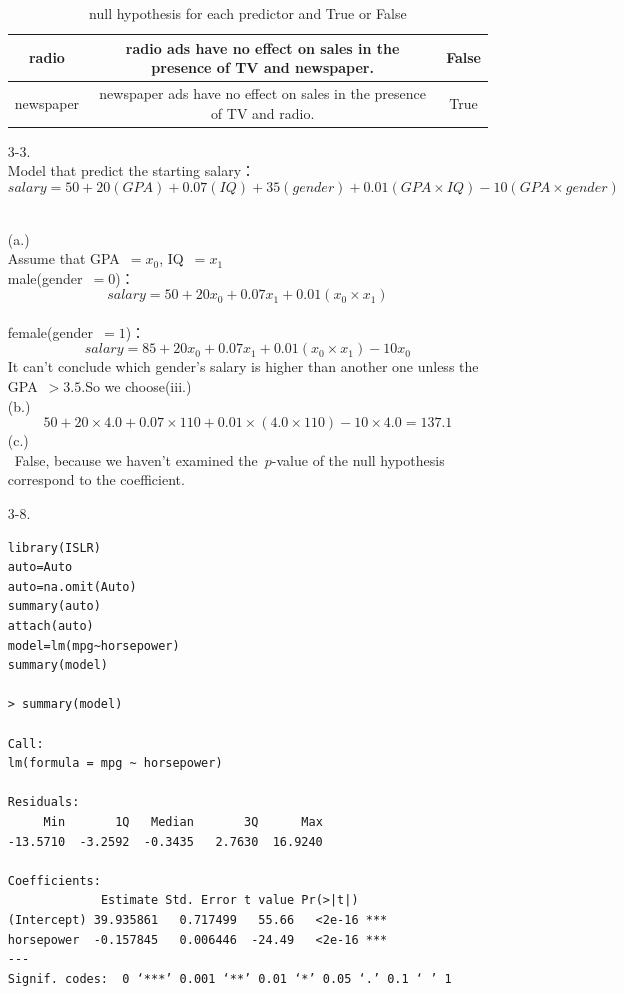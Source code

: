 \documentclass[12pt]{article}
\begin{document}
\begin{itemize}
\begin{table}[h]
\begin{tabular}{|c|c|c|}
   \hline
   radio & radio ads have no effect on sales in the presence of TV and newspaper.& False\\
   \hline
   newspaper & newspaper ads have no effect on sales in the presence of TV and radio.&True\\
   \hline
  \end{tabular}
  \caption{null hypothesis for each predictor and True or False}
  \label{Table.1}
\end{table}
\item[\Large3-3.]
\ \\
Model that predict the starting salary：\\
$$ salary = 50 + 20(GPA) + 0.07(IQ) + 35(gender) + 0.01(GPA \times IQ) - 10 (GPA \times gender)$$\raggedright\\[3ex]
(a.)\\ Assume that GPA\ $=x_{0}$, IQ\ $=x_{1}$\\[2ex]
male(gender\ $=0$)：
$$salary=50+20x_{0}+0.07x_{1}+0.01(x_{0}\times x_{1})$$\\
female(gender\ $=1$)：
$$salary=85+20x_{0}+0.07x_{1}+0.01(x_{0} \times x_{1})-10x_{0}$$
It can't conclude which gender's salary is higher than another one unless the GPA\ $>3.5$.So we choose(iii.)\\[2ex]
(b.)
$$50+20 \times 4.0+0.07 \times 110 + 0.01 \times (4.0 \times 110)-10 \times 4.0 = 137.1$$
(c.)\\[3ex]
\ False, because we haven't examined the\ $p$-value of the null hypothesis correspond to the coefficient.
\item[\Large3-8.]
\ \\
\normalsize
\begin{verbatim}
library(ISLR)
auto=Auto
auto=na.omit(Auto)
summary(auto)
attach(auto)
model=lm(mpg~horsepower)
summary(model)

> summary(model)

Call:
lm(formula = mpg ~ horsepower)

Residuals:
     Min       1Q   Median       3Q      Max
-13.5710  -3.2592  -0.3435   2.7630  16.9240

Coefficients:
             Estimate Std. Error t value Pr(>|t|)
(Intercept) 39.935861   0.717499   55.66   <2e-16 ***
horsepower  -0.157845   0.006446  -24.49   <2e-16 ***
---
Signif. codes:  0 ‘***’ 0.001 ‘**’ 0.01 ‘*’ 0.05 ‘.’ 0.1 ‘ ’ 1


\end{verbatim}
\end{itemize}
\end{document}
